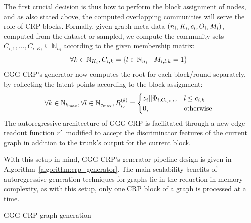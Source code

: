 The first crucial decision is thus how to perform the block assignment of nodes, and as also stated above, the computed overlapping communities will serve the role of CRP blocks. Formally, given graph meta-data $\mathopen{}\left(n_i, K_i, c_i, O_i, M_i\right)$, computed from the dataset or sampled, we compute the community sets $C_{i,1},\dots,C_{i,K_i} \subseteq \mathbb{N}_{n_i}$ according to the given membership matrix: 
\begin{equation}
\forall k \in \mathbb{N}_{K_i},C_{i,k}=\mathopen{}\left\{l \in \mathbb{N}_{n_i} \mid M_{i,l,k} = 1\right\}
\end{equation}
GGG-CRP's generator now computes the root for each block/round separately, by collecting the latent points according to the block assignment:
\begin{equation}
\forall k \in \mathbb{N}_{k_{\max}}, \forall l \in \mathbb{N}_{c_{\max}},
R_{i,l}^{\mathopen{}\left(k\right)} = \begin{cases} z_i||\Phi_{i,C_{i,k,l}}, & l \leq c_{i,k} \\ 0, & \text{otherwise} \end{cases}
\end{equation}
The autoregressive architecture of GGG-CRP is facilitated through a new edge readout function $r'$, modified to accept the discriminator features of the current graph in addition to the trunk's output for the current block. 

With this setup in mind, GGG-CRP's generator pipeline design is given in Algorithm~\ref{algorithm:crp_generator}. The main scalability benefits of autoregressive generation techniques for graphs lie in the reduction in memory complexity, as with this setup, only one CRP block of a graph is processed at a time.

\begin{algorithm}%
\caption{GGG-CRP graph generation}
\label{algorithm:crp_generator}
\begin{algorithmic}
\ENDFOR
{}
\end{algorithmic}
\end{algorithm} 

